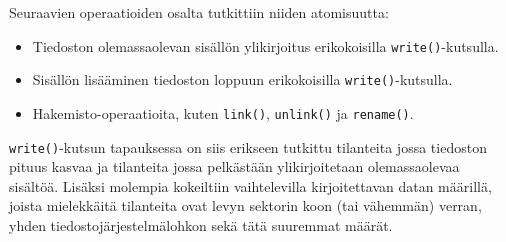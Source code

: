 \newcommand{\hdr}[1]{\rotatebox[origin=l]{90}{\small \texttt{#1}}}
\pgfmathsetlengthmacro\sideA{0.8mm}
\pgfmathsetlengthmacro{}
\pgfmathsetlengthmacro{}
\def\side{1}
\DeclareRobustCommand{\atS}{\tikz{\draw[fill] (0,0) rectangle (\sideA, \sideA); \draw       (\sideA,0) rectangle (\sideB, \sideB); \draw       (\sideB,0) rectangle (\sideC, \sideC); }}
\DeclareRobustCommand{\atB}{\tikz{\draw[fill] (0,0) rectangle (\sideA, \sideA); \draw[fill] (\sideA,0) rectangle (\sideB, \sideB); \draw       (\sideB,0) rectangle (\sideC, \sideC); }}
\DeclareRobustCommand{\atF}{\tikz{\draw[fill] (0,0) rectangle (\sideA, \sideA); \draw[fill] (\sideA,0) rectangle (\sideB, \sideB); \draw[fill] (\sideB,0) rectangle (\sideC, \sideC); }}


Seuraavien operaatioiden osalta tutkittiin niiden atomisuutta:
%
\begin{itemize}
    \item{Tiedoston olemassaolevan sisällön ylikirjoitus erikokoisilla \texttt{write()}-kutsulla.}
    \item{Sisällön lisääminen tiedoston loppuun erikokoisilla \texttt{write()}-kutsulla.}
    \item{Hakemisto-operaatioita, kuten \texttt{link()}, \texttt{unlink()} ja \texttt{rename()}.}
\end{itemize}
%
\texttt{write()}-kutsun tapauksessa on siis erikseen tutkittu tilanteita jossa tiedoston pituus kasvaa ja tilanteita jossa pelkästään ylikirjoitetaan olemassaolevaa sisältöä.
Lisäksi molempia kokeiltiin vaihtelevilla kirjoitettavan datan määrillä,
joista mielekkäitä tilanteita ovat levyn sektorin koon (tai vähemmän) verran, yhden tiedostojärjestelmälohkon sekä tätä suuremmat määrät.

